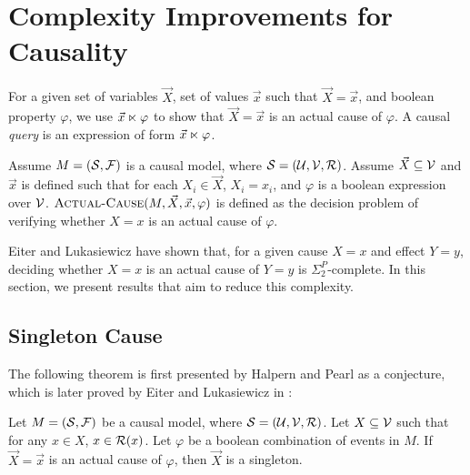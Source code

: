 \section{Complexity Improvements for Causality}

\begin{definition}\label{def:actual-cause-notation}
    For a given set of variables $\vec{X}$, set of values $\vec{x}$
    such that $\vec{X}=\vec{x}$, and boolean property $\varphi$,
    we use $\vec{x} \ltimes \varphi$ to show that $\vec{X}=\vec{x}$ 
    is an actual cause of $\varphi$. A causal \emph{query} is an
    expression of form $\vec{x} \ltimes \varphi$.
\end{definition}

{ \color{gray}
\begin{definition}\label{def:actual-cause-problem}
    Assume $M=(\mathcal{S}, \mathcal{F})$ is a causal model, where 
    $\mathcal{S}=(\mathcal{U}, \mathcal{V}, \mathcal{R})$. Assume
    $\vec{X} \subseteq \mathcal{V}$ and $\vec{x}$ is defined such that for 
    each $X_i \in \vec{X}$, $X_i = x_i$, and $\varphi$ is a boolean 
    expression over $\mathcal{V}$. $\textsc{Actual-Cause}(M, \vec{X}, \vec{x}, \varphi)$
    is defined as the decision problem of verifying whether $X=x$ is 
    an actual cause of $\varphi$.
\end{definition}
}


Eiter and Lukasiewicz \cite{eiter2001complexity} have shown that, for
a given cause $X=x$ and effect $Y=y$, deciding whether $X=x$ is an
actual cause of $Y=y$ is $\Sigma_2^P$-complete. In this section, we 
present results that aim to reduce this complexity.

\subsection{Singleton Cause}

The following theorem is first presented by Halpern and Pearl as a 
conjecture, which is later proved by Eiter and Lukasiewicz in 
\cite{eiter2001complexity}:

\begin{theorem}\label{th:singleton-cause}
    {\color{gray} Let $M=(\mathcal{S}, \mathcal{F})$ be a causal model, where 
    $\mathcal{S}=(\mathcal{U}, \mathcal{V}, \mathcal{R})$. Let $X \subseteq \mathcal{V}$
    such that for any $x \in X$, $x \in \mathcal{R}(x)$. Let $\varphi$ 
    be a boolean combination of events in $M$.} If $\vec{X}=\vec{x}$
    is an actual cause of $\varphi$, then $\vec{X}$ is a singleton.
\end{theorem}

